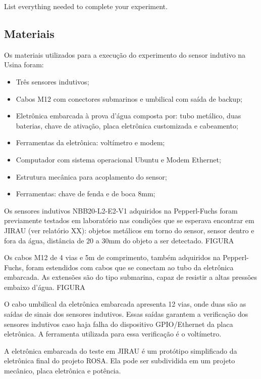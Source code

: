 
List everything needed to complete your experiment.



\subsection{Materiais}
Os materiais utilizados para a execução do experimento do sensor indutivo na
Usina foram:
\begin{itemize}
  \item Três sensores indutivos;
  \item Cabos M12 com conectores submarinos e umbilical com saída de backup;
  \item Eletrônica embarcada à prova d'água composta por: tubo metálico, duas
  baterias, chave de ativação, placa eletrônica customizada e cabeamento;
  \item Ferramentas da eletrônica: voltímetro e modem;
  \item Computador com sistema operacional Ubuntu e Modem Ethernet;
  \item Estrutura mecânica para acoplamento do sensor; 
  \item Ferramentas: chave de fenda e de boca 8mm;
\end{itemize}
Os sensores indutivos NBB20-L2-E2-V1 adquiridos na Pepperl-Fuchs foram
previamente testados em laboratório nas condições que se esperava encontrar em JIRAU (ver relatório XX): objetos
metálicos em torno do sensor, sensor dentro e fora da água, distância de 20 a
30mm do objeto a ser detectado. FIGURA

Os cabos M12 de 4 vias e 5m de comprimento, também adquiridos na Pepperl-Fuchs,
foram esten\-didos com cabos que se conectam ao tubo da eletrô\-nica embarcada.
As extensões são do tipo submarina, capaz de resistir a altas pressões embaixo
d'água. FIGURA

O cabo umbilical da eletrônica embarcada apresenta 12 vias, onde duas são as
saídas de sinais dos sensores indutivos. Essas saídas garantem a
verificação dos sensores indutivos caso haja falha do dispositivo GPIO/Ethernet
da placa eletrônica. A ferramenta utilizada para essa verificação é o
voltímetro.

A eletrônica embarcada do teste em JIRAU é um protótipo simplificado da
eletrônica final do projeto ROSA. Ela pode ser subdividida em um projeto
mecânico, placa eletrônica e potência. 

